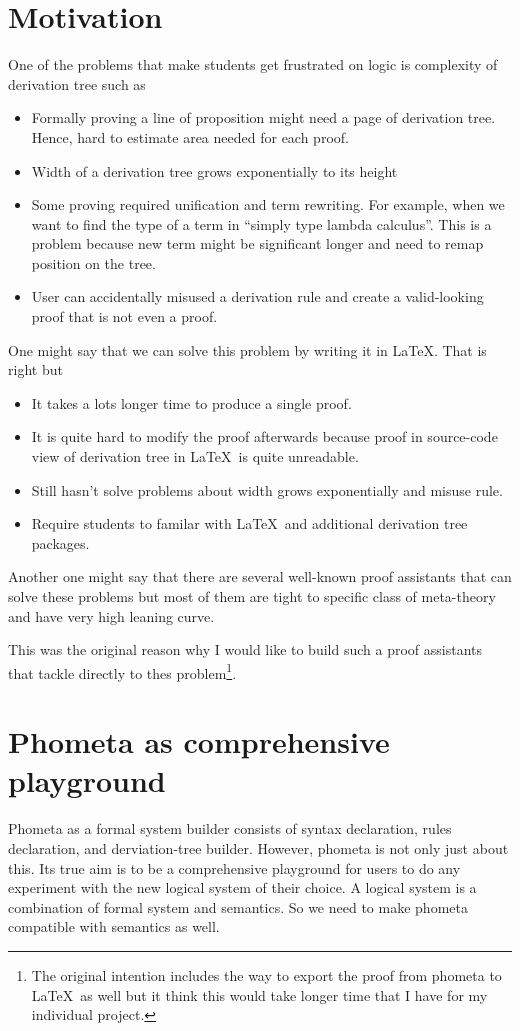 \section{Motivation}
One of the problems that make students get frustrated on logic is complexity of derivation tree such as

\begin{itemize}
    \item Formally proving a line of proposition might need a page of derivation tree. Hence, hard to estimate area needed for each proof.
    \item Width of a derivation tree grows exponentially to its height
    \item Some proving required unification and term rewriting. For example, when we want to find the type of a term in ``simply type lambda calculus''. This is a problem because new term might be significant longer and need to remap position on the tree.
    \item User can accidentally misused a derivation rule and create a valid-looking proof that is not even a proof.
\end{itemize}

One might say that we can solve this problem by writing it in \LaTeX. That is right but
\begin{itemize}
    \item It takes a lots longer time to produce a single proof.
    \item It is quite hard to modify the proof afterwards because proof in source-code view of derivation tree in \LaTeX\ is quite unreadable.
    \item Still hasn't solve problems about width grows exponentially and misuse rule.
    \item Require students to familar with \LaTeX\ and additional derivation tree packages.
\end{itemize}

Another one might say that there are several well-known proof assistants that can solve these problems but most of them are tight to specific class of meta-theory and have very high leaning curve.

This was the original reason why I would like to build such a proof assistants that tackle directly to thes problem\footnote{The original intention includes the way to export the proof from phometa to \LaTeX\ as well but it think this would take longer time that I have for my individual project.}.

\section{Phometa as comprehensive playground}
Phometa as a formal system builder consists of syntax declaration, rules declaration, and derviation-tree builder. However, phometa is not only just about this. Its true aim is to be a comprehensive playground for users to do any experiment with the new logical system of their choice. A logical system is a combination of formal system and semantics. So we need to make phometa compatible with semantics as well.

